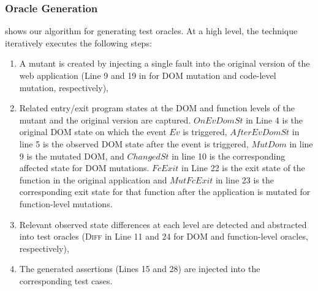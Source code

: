 \subsubsection{Oracle Generation} \label{Sec:oracleGen}

 shows our algorithm for generating test oracles. 
At a high level, the technique iteratively executes the following steps:



\begin{enumerate}%
\item A mutant is created by injecting a single fault into the original version of the web application (Line 9 and 19 in  for DOM mutation and code-level mutation, respectively), 
\item Related entry/exit program states at the DOM and \javascript function levels of the mutant and the original version are captured. $OnEvDomSt$ in Line 4 is the original DOM state on which the event $Ev$ is triggered, $AfterEvDomSt$ in line 5 is the observed DOM state after the event is triggered, $MutDom$ in line 9 is the mutated DOM, and $ChangedSt$ in line 10 is the corresponding affected state for DOM mutations. $FcExit$ in Line 22 is the exit
state of the function in the original application and $MutFcExit$ in line 23 is the corresponding exit state for that function after the application is mutated for function-level mutations.
\item Relevant observed state differences at each level are detected and abstracted into test oracles (\textsc{Diff} in Line 11 and 24 for DOM and function-level oracles,  respectively),
\item The generated assertions (Lines 15 and 28) are injected into the corresponding test cases. %
\end{enumerate}


